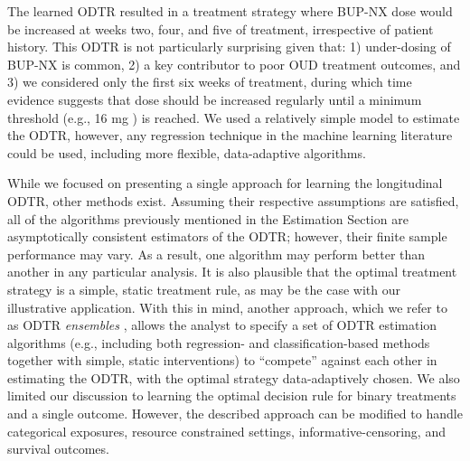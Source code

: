\documentclass[11pt]{article}
\theoremstyle{example}
\begin{document}
The learned ODTR resulted in a treatment strategy where BUP-NX dose would be increased at weeks two, four, and five of treatment, irrespective of patient history. This ODTR is not particularly surprising given that: 1) under-dosing of BUP-NX is common,\citep{gordon2015patterns} 2) a key contributor to poor OUD treatment outcomes,\citep{d2019evidence} and 3) we considered only the first six weeks of treatment, during which time evidence suggests that dose should be increased regularly until a minimum threshold (e.g., 16 mg \citep{tip2021}) is reached.\citep{rudolph2022dose} We used a relatively simple model to estimate the ODTR, however, any regression technique in the machine learning literature could be used, including more flexible, data-adaptive algorithms.

While we focused on presenting a single approach for learning the longitudinal ODTR, other methods exist. Assuming their respective assumptions are satisfied, all of the algorithms previously mentioned in the Estimation Section are asymptotically consistent estimators of the ODTR; however, their finite sample performance may vary. As a result, one algorithm may perform better than another in any particular analysis.\citep{WangEHR} It is also plausible that the optimal treatment strategy is a simple, static treatment rule, as may be the case with our illustrative application. With this in mind, another approach, which we refer to as ODTR \emph{ensembles} ,\citep{luedtkeSLodtr,MontoyavanderLaanLuedtkeSkeemCoylePetersen2022, DiazEnsembleTTE} allows the analyst to specify a set of ODTR estimation algorithms (e.g., including both regression- and classification-based methods together with simple, static interventions) to ``compete'' against each other in estimating the ODTR, with the optimal strategy data-adaptively chosen. We also limited our discussion to learning the optimal decision rule for binary treatments and a single outcome. However, the described approach can be modified to handle categorical exposures,\citep{tlverseHandbook} resource constrained settings,\citep{luedtke2016optimal} informative-censoring,\citep{luedtkeSLodtr} and survival outcomes.\citep{DiazEnsembleTTE}

\newpage

\newpage
\renewcommand{\refname}{References}



\appendix

\end{document}
